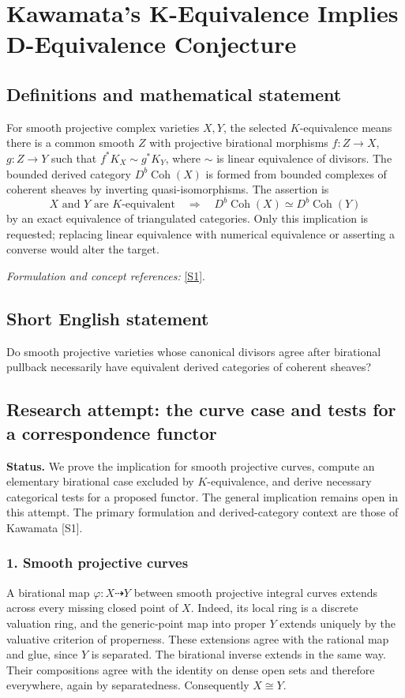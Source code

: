 \documentclass[11pt]{article}
\begin{document}
\section*{\texorpdfstring{Kawamata's K-Equivalence Implies D-Equivalence Conjecture}{Kawamata's K-Equivalence Implies D-Equivalence Conjecture}}\label{statement}
\subsection{Definitions and mathematical statement}
For smooth projective complex varieties $X,Y$, the selected $K$-equivalence means there is a common smooth $Z$ with projective birational morphisms $f:Z\to X$, $g:Z\to Y$ such that
$f^*K_X\sim g^*K_Y$, where $\sim$ is linear equivalence of divisors. The bounded derived category $D^b\operatorname{Coh}(X)$ is formed from bounded complexes of coherent sheaves by inverting quasi-isomorphisms. The assertion is
\[
 X\text{ and }Y\text{ are }K\text{-equivalent}
 \quad\Longrightarrow\quad D^b\operatorname{Coh}(X)\simeq D^b\operatorname{Coh}(Y)
\]
by an exact equivalence of triangulated categories. Only this implication is requested; replacing linear equivalence with numerical equivalence or asserting a converse would alter the target.
\par\smallskip\textit{Formulation and concept references:} \href{https://arxiv.org/abs/math/0205287}{[S1]}.

\subsection{Short English statement}
Do smooth projective varieties whose canonical divisors agree after birational pullback necessarily have equivalent derived categories of coherent sheaves?
\subsection{Research attempt: the curve case and tests for a correspondence functor}
\textbf{Status.} We prove the implication for smooth projective curves, compute an elementary birational case excluded by $K$-equivalence, and derive necessary categorical tests for a proposed functor. The general implication remains open in this attempt. The primary formulation and derived-category context are those of Kawamata [S1].

\subsubsection{1. Smooth projective curves}
A birational map $\varphi:X\dashrightarrow Y$ between smooth projective integral curves extends across every missing closed point of $X$. Indeed, its local ring is a discrete valuation ring, and the generic-point map into proper $Y$ extends uniquely by the valuative criterion of properness. These extensions agree with the rational map and glue, since $Y$ is separated. The birational inverse extends in the same way. Their compositions agree with the identity on dense open sets and therefore everywhere, again by separatedness. Consequently $X\cong Y$.
\end{document}

